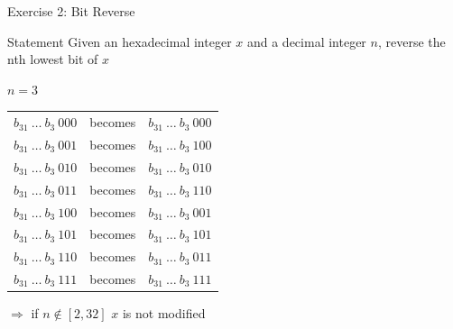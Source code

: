 \documentclass{beamer}
\begin{document}
\begin{frame}[fragile]{Exercise 2: Bit Reverse}
  \begin{block}{Statement}
    Given an hexadecimal integer $x$ and a decimal integer $n$, reverse the nth lowest bit of $x$
  \end{block}
  
  \begin{block}{$n=3$}
    \begin{center}
      \begin{tabular}{*{3}{c}}
        $b_{31}\ \dots\ b_3\ 0 0 0$ & becomes & $b_{31}\ \dots\ b_3\ 0 0 0$\\
        $b_{31}\ \dots\ b_3\ 0 0 1$ & becomes & $b_{31}\ \dots\ b_3\ 1 0 0$\\
        $b_{31}\ \dots\ b_3\ 0 1 0$ & becomes & $b_{31}\ \dots\ b_3\ 0 1 0$\\
        $b_{31}\ \dots\ b_3\ 0 1 1$ & becomes & $b_{31}\ \dots\ b_3\ 1 1 0$\\
        $b_{31}\ \dots\ b_3\ 1 0 0$ & becomes & $b_{31}\ \dots\ b_3\ 0 0 1$\\
        $b_{31}\ \dots\ b_3\ 1 0 1$ & becomes & $b_{31}\ \dots\ b_3\ 1 0 1$\\
        $b_{31}\ \dots\ b_3\ 1 1 0$ & becomes & $b_{31}\ \dots\ b_3\ 0 1 1$\\
        $b_{31}\ \dots\ b_3\ 1 1 1$ & becomes & $b_{31}\ \dots\ b_3\ 1 1 1$\\
      \end{tabular}
    \end{center}
  \end{block}
  
  $\Rightarrow$ if $n \not\in [2, 32]$ $x$ is not modified
\end{frame}
\end{document}
